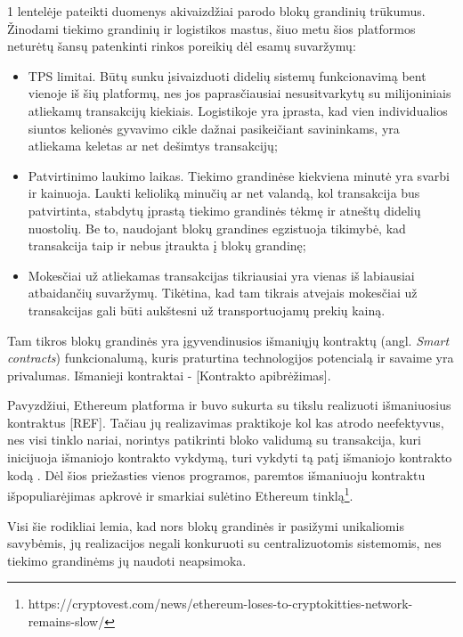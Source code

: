 1 lentelėje pateikti duomenys akivaizdžiai parodo blokų grandinių trūkumus. Žinodami tiekimo grandinių ir logistikos mastus, šiuo metu šios platformos neturėtų šansų patenkinti rinkos poreikių dėl esamų suvaržymų: 
\begin{itemize}
    \item TPS limitai. Būtų sunku įsivaizduoti didelių sistemų funkcionavimą bent vienoje iš šių platformų, nes jos paprasčiausiai nesusitvarkytų su milijoniniais atliekamų transakcijų kiekiais. Logistikoje yra įprasta, kad vien individualios siuntos kelionės gyvavimo cikle dažnai pasikeičiant savininkams, yra atliekama keletas ar net dešimtys transakcijų;
    \item Patvirtinimo laukimo laikas. Tiekimo grandinėse kiekviena minutė yra svarbi ir kainuoja. Laukti kelioliką minučių ar net valandą, kol transakcija bus patvirtinta, stabdytų įprastą tiekimo grandinės tėkmę ir atneštų didelių nuostolių. Be to, naudojant blokų grandines egzistuoja tikimybė, kad transakcija taip ir nebus įtraukta į blokų grandinę;
    \item Mokesčiai už atliekamas transakcijas tikriausiai yra vienas iš labiausiai atbaidančių suvaržymų. Tikėtina, kad tam tikrais atvejais mokesčiai už transakcijas gali būti aukštesni už transportuojamų prekių kainą.
\end{itemize} 

Tam tikros blokų grandinės yra įgyvendinusios išmaniųjų kontraktų (angl. \textit{Smart contracts}) funkcionalumą, kuris praturtina technologijos potencialą ir savaime yra privalumas. Išmanieji kontraktai - [Kontrakto apibrėžimas]. 

Pavyzdžiui, Ethereum platforma ir buvo sukurta su tikslu realizuoti išmaniuosius kontraktus [REF]. Tačiau jų realizavimas praktikoje kol kas atrodo neefektyvus, nes visi tinklo nariai, norintys patikrinti bloko validumą su transakcija, kuri inicijuoja išmaniojo kontrakto vykdymą, turi vykdyti tą patį išmaniojo kontrakto kodą \cite{buterin2013ethereum}. Dėl šios priežasties vienos programos, paremtos išmaniuoju kontraktu išpopuliarėjimas apkrovė ir smarkiai sulėtino Ethereum tinklą\footnote{https://cryptovest.com/news/ethereum-loses-to-cryptokitties-network-remains-slow/}.

Visi šie rodikliai lemia, kad nors blokų grandinės ir pasižymi unikaliomis savybėmis, jų realizacijos negali konkuruoti su centralizuotomis sistemomis, nes tiekimo grandinėms jų naudoti neapsimoka. 




